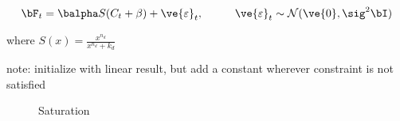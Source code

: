 \begin{align}
\bF_t &= \balpha S(C_t + \beta) +  \ve{\varepsilon}_t, \qquad &\ve{\varepsilon}_t \sim \mathcal{N}(\ve{0},\sig^2 \bI)
\end{align}

\noindent where $S(x)=\frac{x^{n_d}}{x^{n_d}+k_d}$

note: initialize with linear result, but add a constant wherever constraint is not satisfied

\begin{figure}[H]
\caption{Saturation} \label{fig:satur}
\end{figure}
